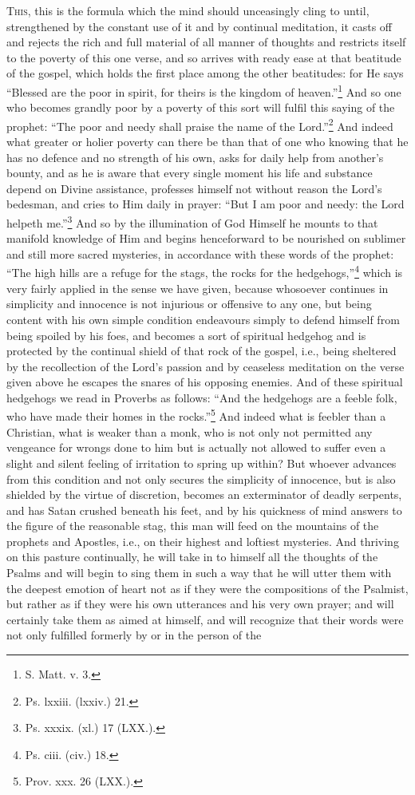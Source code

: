 \textsc{This}, this is the formula which the mind should unceasingly cling to until, strengthened by the constant use of it and by continual meditation, it casts off and rejects the rich and full material of all manner of thoughts and restricts itself to the poverty of this one verse, and so arrives with ready ease at that beatitude of the gospel, which holds the first place among the other beatitudes: for He says “Blessed are the poor in spirit, for theirs is the kingdom of heaven.”\footnote{S. Matt. v. 3.} And so one who becomes grandly poor by a poverty of this sort will fulfil this saying of the prophet: “The poor and needy shall praise the name of the Lord.”\footnote{Ps. lxxiii. (lxxiv.) 21.} And indeed what greater or holier poverty can there be than that of one who knowing that he has no defence and no strength of his own, asks for daily help from another’s bounty, and as he is aware that every single moment his life and substance depend on Divine assistance, professes himself not without reason the Lord’s bedesman, and cries to Him daily in prayer: “But I am poor and needy: the Lord helpeth me.”\footnote{Ps. xxxix. (xl.) 17 (LXX.).} And so by the illumination of God Himself he mounts to that manifold knowledge of Him and begins henceforward to be nourished on sublimer and still more sacred mysteries, in accordance with these words of the prophet: “The high hills are a refuge for the stags, the rocks for the hedgehogs,”\footnote{Ps. ciii. (civ.) 18.} which is very fairly applied in the sense we have given, because whosoever continues in simplicity and innocence is not injurious or offensive to any one, but being content with his own simple condition endeavours simply to defend himself from being spoiled by his foes, and becomes a sort of spiritual hedgehog and is protected by the continual shield of that rock of the gospel, i.e., being sheltered by the recollection of the Lord’s passion and by ceaseless meditation on the verse given above he escapes the snares of his opposing enemies. And of these spiritual hedgehogs we read in Proverbs as follows: “And the hedgehogs are a feeble folk, who have made their homes in the rocks.”\footnote{Prov. xxx. 26 (LXX.).} And indeed what is feebler than a Christian, what is weaker than a monk, who is not only not permitted any vengeance for wrongs done to him but is actually not allowed to suffer even a slight and silent feeling of irritation to spring up within? But whoever advances from this condition and not only secures the simplicity of innocence, but is also shielded by the virtue of discretion, becomes an exterminator of deadly serpents, and has Satan crushed beneath his feet, and by his quickness of mind answers to the figure of the reasonable stag, this man will feed on the mountains of the prophets and Apostles, i.e., on their highest and loftiest mysteries. And thriving on this pasture continually, he will take in to himself all the thoughts of the Psalms and will begin to sing them in such a way that he will utter them with the deepest emotion of heart not as if they were the compositions of the Psalmist, but rather as if they were his own utterances and his very own prayer; and will certainly take them as aimed at himself, and will recognize that their words were not only fulfilled formerly by or in the person of the 